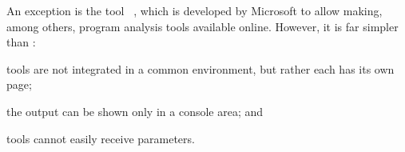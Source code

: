 %
An exception is the tool ~\cite{rise4fun}, which is
developed by Microsoft to allow making, among others, program analysis
tools available online.
%
However, it is far simpler than \ei: 
\begin{inparaenum}
\item tools are not integrated in a common environment, but rather
  each has its own page; 
\item the output can be shown only in a console area; and
\item tools cannot easily receive parameters.
\end{inparaenum}



